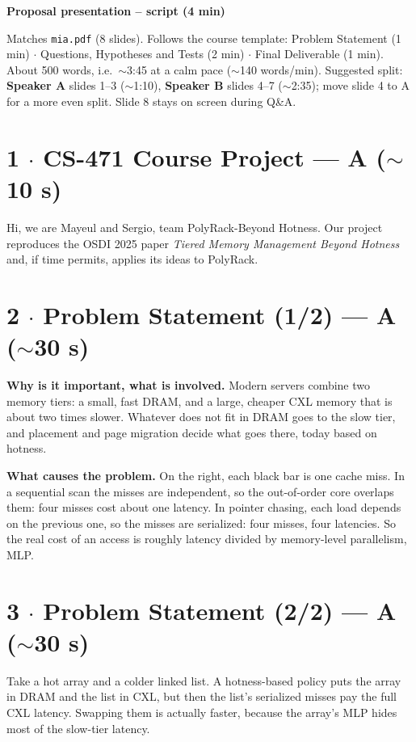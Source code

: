 \documentclass[11pt]{article}
\begin{document}
{\LARGE\bfseries Proposal presentation -- script (4 min)\par}
\medskip
Matches \texttt{mia.pdf} (8 slides). Follows the course template: Problem
Statement (1 min) $\cdot$ Questions, Hypotheses and Tests (2 min) $\cdot$
Final Deliverable (1 min).
About 500 words, i.e.\ $\sim$3:45 at a calm pace ($\sim$140 words/min).
Suggested split: \textbf{Speaker A} slides 1--3 ($\sim$1:10), \textbf{Speaker
B} slides 4--7 ($\sim$2:35); move slide 4 to A for a more even split.
Slide 8 stays on screen during Q\&A.

\hrulefill

\section{1 $\cdot$ CS-471 Course Project --- A ($\sim$10 s)}
Hi, we are Mayeul and Sergio, team PolyRack-Beyond Hotness. Our project
reproduces the OSDI 2025 paper \emph{Tiered Memory Management Beyond Hotness}
and, if time permits, applies its ideas to PolyRack.

\section{2 $\cdot$ Problem Statement (1/2) --- A ($\sim$30 s)}
\textbf{Why is it important, what is involved.} Modern servers combine two
memory tiers: a small, fast DRAM, and a large, cheaper CXL memory that is
about two times slower. Whatever does not fit in DRAM goes to the slow tier,
and placement and page migration decide what goes there, today based on
hotness.

\textbf{What causes the problem.} On the right, each black bar is one cache
miss. In a sequential scan the misses are independent, so the out-of-order
core overlaps them: four misses cost about one latency. In pointer chasing,
each load depends on the previous one, so the misses are serialized: four
misses, four latencies. So the real cost of an access is roughly latency
divided by memory-level parallelism, MLP.

\section{3 $\cdot$ Problem Statement (2/2) --- A ($\sim$30 s)}
Take a hot array and a colder linked list. A hotness-based policy puts the
array in DRAM and the list in CXL, but then the list's serialized misses pay
the full CXL latency. Swapping them is actually faster, because the array's
MLP hides most of the slow-tier latency.
\end{document}
